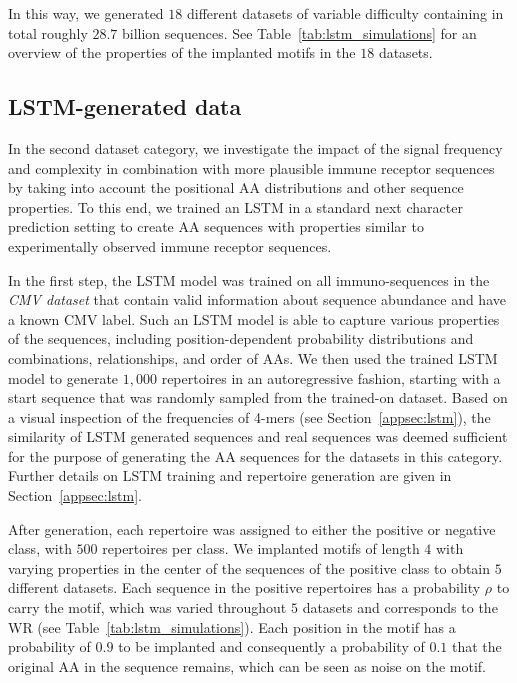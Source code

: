 \documentclass[oneside]{book}
\begin{document}
In this way, we generated $18$ different datasets of variable 
difficulty containing in total roughly $28.7$ billion sequences. 
See Table~\ref{tab:lstm_simulations} for an overview of the properties 
of the implanted motifs in the $18$ datasets.
%

\subsection{LSTM-generated data}\label{subsec:lstm_generated_data}
In the second dataset category,
we investigate the impact of the signal frequency and complexity
in combination with more plausible immune receptor sequences
by taking into account the positional AA distributions
and other sequence properties.
To this end, we trained an LSTM \citep{hochreiter1997long} in a standard 
next character prediction \citep{graves2013generating}
setting to create AA sequences with properties similar to experimentally observed immune receptor sequences.

In the first step, the LSTM model  
was trained on all immuno-sequences in the \emph{CMV dataset} 
\citep{emerson2017immunosequencing} that contain valid information 
about sequence abundance and have a known CMV label.
Such an LSTM model is able to capture various properties of the sequences,
including position-dependent probability distributions and
combinations, relationships, and order of AAs.
We then used the trained LSTM model to generate $1,000$ repertoires
in an autoregressive fashion,
starting with a start sequence that was randomly 
sampled from the trained-on dataset.
Based on a visual inspection of the frequencies of 4-mers (see Section~\ref{appsec:lstm}),
the similarity of LSTM generated sequences and real sequences
was deemed sufficient for the purpose of generating the AA sequences
for the datasets in this category.
Further details on LSTM training and repertoire generation are given in Section~\ref{appsec:lstm}.
%

After generation,
each repertoire was assigned to either the positive or negative class,
with $500$ repertoires per class.
We implanted motifs of length $4$ with varying properties
in the center of the sequences of the positive class
to obtain $5$ different datasets.
Each sequence in the positive repertoires has a probability 
$\rho$ to carry the motif,
which was varied throughout $5$ datasets
and corresponds to the WR (see Table~\ref{tab:lstm_simulations}).
Each position in the motif has a probability of $0.9$ to be implanted
and consequently a probability of $0.1$ that the original AA in the sequence remains,
which can be seen as noise on the motif.
\end{document}
